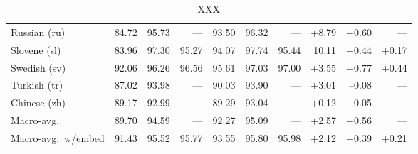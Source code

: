 \documentclass[11pt,letterpaper]{article}
\begin{document}
\begin{table}
\begin{tabular}{l|rrr|rrr|rrr}
Russian (ru) & 84.72 & 95.73 & --- & 93.50 & 96.32 & --- & +8.79 & +0.60 & ---\\
Slovene (sl) & 83.96 & 97.30 & 95.27 & 94.07 & 97.74 & 95.44 & 10.11 & +0.44 & +0.17\\
Swedish (sv) & 92.06 & 96.26 & 96.56 & 95.61 & 97.03 & 97.00 & +3.55 & +0.77 & +0.44\\
Turkish (tr) & 87.02 & 93.98 & --- & 90.03 & 93.90 & --- & +3.01 & --0.08 & ---\\
Chinese (zh) & 89.17 & 92.99 & --- & 89.29 & 93.04 & --- & +0.12 & +0.05 & ---\\
\midrule
Macro-avg. & 89.70 & 94.59 & --- & 92.27 & 95.09 & --- & +2.57 & +0.56 & ---\\
Macro-avg.~w/embed & 91.43 & 95.52 & 95.77 & 93.55 & 95.80 & 95.98 & +2.12 & +0.39 & +0.21\\
\end{tabular}
\caption{XXX}\label{tbl:results}
\end{table}






\end{document}
